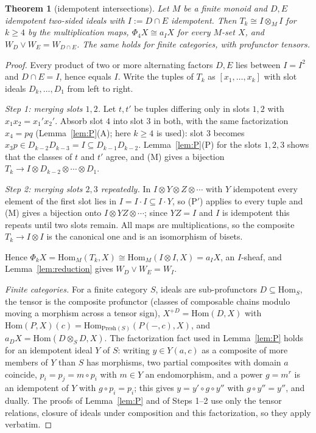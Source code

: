 \documentclass[11pt]{amsart}
\newtheorem{thm}{Theorem}[section]
\theoremstyle{definition}
\newcommand{\Presh}{\mathrm{Presh}}
\newcommand{\Hom}{\mathrm{Hom}}
\begin{document}
\begin{thm}[idempotent intersections]\label{thm:monoid}
Let $M$ be a finite monoid and $D,E$ idempotent two-sided ideals with
$I:=D\cap E$ idempotent. Then $T_k\cong I\otimes_MI$ for $k\ge4$ by the
multiplication maps, $\Phi_4X\cong a_IX$ for every $M$-set $X$, and
$W_D\vee W_E=W_{D\cap E}$. The same holds for finite categories, with
profunctor tensors.
\end{thm}
\begin{proof}
Every product of two or more alternating factors $D,E$ lies between $I=I^2$
and $D\cap E=I$, hence equals $I$. Write the tuples of $T_k$ as
$[x_1,\dots,x_k]$ with slot ideals $D_k,\dots,D_1$ from left to right.

\emph{Step 1: merging slots $1,2$.} Let $t,t'$ be tuples differing only in
slots $1,2$ with $x_1x_2=x_1'x_2'$. Absorb slot $4$ into slot $3$ in both,
with the same factorization $x_4=pq$ (Lemma~\ref{lem:P}(A); here $k\ge4$ is
used): slot $3$ becomes $x_3p\in D_{k-2}D_{k-3}=I\subseteq D_{k-1}D_{k-2}$.
Lemma~\ref{lem:P}(P) for the slots $1,2,3$ shows that the classes of $t$ and
$t'$ agree, and (M) gives a bijection
$T_k\to I\otimes D_{k-2}\otimes\cdots\otimes D_1$.

\emph{Step 2: merging slots $2,3$ repeatedly.} In $I\otimes Y\otimes Z\otimes\cdots$
with $Y$ idempotent every element of the first slot lies in $I=I\cdot I\subseteq
I\cdot Y$, so (P$'$) applies to every tuple and (M) gives a bijection onto
$I\otimes YZ\otimes\cdots$; since $YZ=I$ and $I$ is idempotent this repeats
until two slots remain. All maps are multiplications, so the composite
$T_k\to I\otimes I$ is the canonical one and is an isomorphism of bisets.

Hence $\Phi_kX=\Hom_M(T_k,X)\cong\Hom_M(I\otimes I,X)=a_IX$, an $I$-sheaf, and
Lemma~\ref{lem:reduction} gives $W_D\vee W_E=W_I$.

\emph{Finite categories.} For a finite category $S$, ideals are
sub-profunctors $D\subseteq\Hom_S$, the tensor is the composite profunctor
(classes of composable chains modulo moving a morphism across a tensor sign),
$X^{+D}=\Hom(D,X)$ with $\Hom(P,X)(c)=\Hom_{\Presh(S)}(P(-,c),X)$, and
$a_DX=\Hom(D\otimes_SD,X)$. The factorization fact used in Lemma~\ref{lem:P}
holds for an idempotent ideal $Y$ of $S$: writing $y\in Y(a,c)$ as a composite
of more members of $Y$ than $S$ has morphisms, two partial composites with
domain $a$ coincide, $p_i=p_j=m\circ p_i$ with $m\in Y$ an endomorphism, and a
power $g=m^r$ is an idempotent of $Y$ with $g\circ p_i=p_i$; this gives
$y=y'\circ g\circ y''$ with $g\circ y''=y''$, and dually. The proofs of
Lemma~\ref{lem:P} and of Steps 1--2 use only the tensor relations, closure of
ideals under composition and this factorization, so they apply verbatim.
\end{proof}
\end{document}
